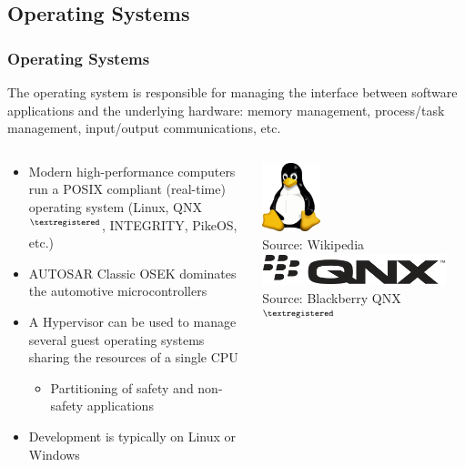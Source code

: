 \subsection{Operating Systems}

\begin{frame}
\frametitle{Operating Systems}
The operating system is responsible for managing the interface between software
applications and the underlying hardware: memory management, process/task
management, input/output communications, etc.
\begin{columns}[]
    \begin{column}{0.7\textwidth}
        \begin{itemize}
            \item Modern high-performance computers run a
                POSIX compliant (real-time) operating system (Linux, QNX$^{\tiny{\textregistered}}$,
                INTEGRITY, PikeOS, etc.)
            \item AUTOSAR Classic OSEK \cite{ISO17356} dominates the automotive microcontrollers
            \item A Hypervisor can be used to manage several guest operating systems
                sharing the resources of a single CPU
                \begin{itemize}
                    \item Partitioning of safety and non-safety applications
                \end{itemize}
            \item Development is typically on Linux or Windows
        \end{itemize}
    \end{column}
    \begin{column}{0.3\textwidth}
        \centering
        \includegraphics[height=2cm]{images/linux-logo.png}\\
        \scriptsize Source: Wikipedia\footnotemark[1]\\
        \vspace{0.5cm}
        \includegraphics[width=0.9\textwidth]{images/qnx-logo.png}\\
        \scriptsize Source: Blackberry QNX$^{\tiny{\textregistered}}$\footnotemark[2]
    \end{column}
\end{columns}
\end{frame}